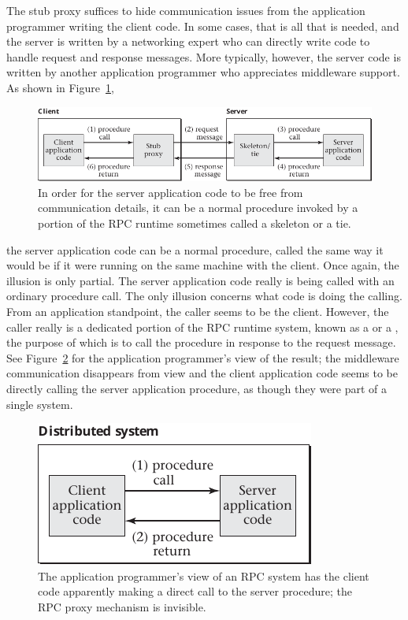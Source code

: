 The stub proxy suffices to hide communication issues from the
application programmer writing the client code.  In some cases, that
is all that is needed, and the server is written by a networking
expert who can directly write code to handle request and response
messages.  More typically, however, the server code is written by
another application programmer who appreciates middleware support.
As shown in Figure~\ref{scan-10-4},
\begin{figure}
\centerline{\includegraphics{hail_f1004}}
\caption{In order for the server application code to be free from
  communication details, it can be a normal procedure invoked by a
  portion of the RPC runtime sometimes called a skeleton or a tie.}
\label{scan-10-4}
\end{figure}
the server application code can be a
normal procedure, called the same way it would be if it were running
on the same machine with the client.  Once again, the illusion is only
partial.  The server application code really is being called with an
ordinary procedure call.  The only illusion concerns what code is
doing the calling.  From an application standpoint, the caller seems
to be the client.  However, the caller really is a dedicated portion of the
RPC runtime system, known as a  or a ,
the purpose of which is to call the procedure in response to the
request message.  See Figure~\ref{scan-10-5} for the application
programmer's view of the result; the middleware communication
disappears from view and the client application code seems to be
directly calling the server application procedure, as though they were
part of a single system.
\begin{figure}
\centerline{\includegraphics{hail_f1005}}
\caption{The application programmer's view of an RPC system has the
  client code apparently making a direct call to the server procedure;
  the RPC proxy mechanism is invisible.}
\label{scan-10-5}
\end{figure}

